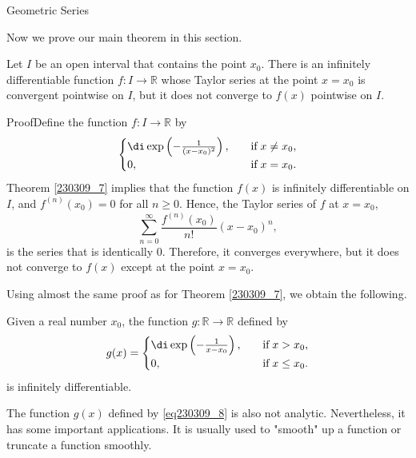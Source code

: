 \begin{example}[label=230305_16]{Geometric Series}
\begin{example}[label=230304_9]{}
\begin{example}{}
\begin{example}{}
Now we prove our main theorem in this section.
\begin{theorem}{}Let $I$ be an open interval that contains the point $x_0$. There is an infinitely differentiable function $f:I\to\mathbb{R}$ whose Taylor series at the point $x=x_0$  is convergent pointwise on $I$, but it does not converge to $f(x)$ pointwise on $I$.
\end{theorem}
\begin{myproof}{Proof}Define the function $f:I\to\mathbb{R}$ by
\begin{equation*} \begin{cases}\di\exp\left(-\frac{1}{(x-x_0)^2}\right),\quad &\text{if}\;x\neq x_0,\\0,\quad &\text{if}\;x=x_0.\end{cases}\end{equation*}Theorem \ref{230309_7} implies  that
 the function $f(x)$  is infinitely differentiable on $I$, and 
$f^{(n)}(x_0)=0$ for all $n\geq 0$. Hence, the Taylor series of $f$ at $x=x_0$,\bp
\[\sum_{n=0}^{\infty}\frac{f^{(n)}(x_0)}{n!}(x-x_0)^n,\] is the series that is identically 0. Therefore, it converges everywhere, but it does not converge to $f(x)$ except at the point $x=x_0$.  
\end{myproof}

 Using almost the same proof as for Theorem \ref{230309_7}, we obtain the following.
\begin{theorem}[label=230309_11]{}
Given a real number $x_0$, the function $g:\mathbb{R}\to\mathbb{R}$ defined by
\begin{equation}\label{eq230309_8}g(x)=\begin{cases} \di\exp\left(-\frac{1}{x-x_0}\right),\quad &\text{if}\;x> x_0,\\0,\quad &\text{if}\;x\leq x_0.\end{cases}\end{equation} is infinitely differentiable.
\end{theorem}



The function $g(x)$ defined by \eqref{eq230309_8} is also not analytic. Nevertheless, it has some important applications. It is usually used to "smooth" up a function or truncate a function smoothly.




\end{example}
\end{example}
\end{example}
\end{example}
